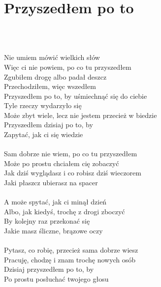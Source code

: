 \documentclass[a5paper, 10pt]{book}
\begin{document}
\newpage
\section{Przyszedłem po to}\textcolor{lightgray}{\textit{}}\\~\\
\begin{minipage}[t]{0.8\textwidth}
Nie umiem mówić wielkich słów\\
Więc ci nie powiem, po co tu przyszedłem\\
Zgubiłem drogę albo padał deszcz\\
Przechodziłem, więc wszedłem\\

\hspace*{5mm}Przyszedłem po to, by uśmiechnąć się do ciebie\\

Tyle rzeczy wydarzyło się\\
Może zbyt wiele, lecz nie jestem przecież w biedzie\\
Przyszedłem dzisiaj po to, by\\
Zapytać, jak ci się wiedzie\\
\\
Sam dobrze nie wiem, po co tu przyszedłem\\
Może po prostu chciałem cię zobaczyć\\
Jak dziś wyglądasz i co robisz dziś wieczorem\\
Jaki płaszcz ubierasz na spacer\\
\\
A może spytać, jak ci minął dzień\\
Albo, jak kiedyś, trochę z drogi zboczyć\\
By kolejny raz przekonać się\\
Jakie masz śliczne, brązowe oczy\\
\\
Pytasz, co robię, przecież sama dobrze wiesz\\
Pracuję, chodzę i znam trochę nowych osób\\
Dzisiaj przyszedłem po to, by\\
Po prostu posłuchać twojego głosu\\
\end{minipage}
\end{document}
